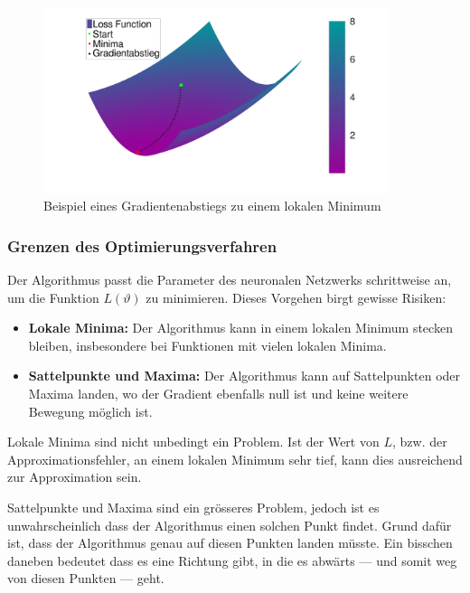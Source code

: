 \begin{figure}
    \centering
    \hspace*{-0.1\textwidth}
    \includegraphics[width=0.9\textwidth]{papers/neuronal/images/gd_close_to_minima_long_distances_with_line.png}
    \caption{Beispiel eines Gradientenabstiegs zu einem lokalen Minimum}
    \label{fig:gradientenabstieg_beispiel}
\end{figure}


\subsubsection{Grenzen des Optimierungsverfahren}\label{neuronal:subsubsection:optimierungsverfahren_grenzen}

Der Algorithmus passt die Parameter des neuronalen Netzwerks schrittweise an, um die Funktion \( L(\vartheta) \) zu minimieren. 
Dieses Vorgehen birgt gewisse Risiken:
\begin{itemize}
    \item \textbf{Lokale Minima:} Der Algorithmus kann in einem lokalen Minimum stecken bleiben, insbesondere bei Funktionen mit vielen lokalen Minima.
%
    \item \textbf{Sattelpunkte und Maxima:} Der Algorithmus kann auf Sattelpunkten oder Maxima landen, wo der Gradient ebenfalls null ist und keine weitere Bewegung möglich ist.
%
%
\end{itemize}

Lokale Minima sind nicht unbedingt ein Problem. 
Ist der Wert von $L$, bzw. der Approximationsfehler, an einem lokalen Minimum sehr tief, kann dies ausreichend zur Approximation sein.

Sattelpunkte und Maxima sind ein grösseres Problem, jedoch ist es unwahrscheinlich dass der Algorithmus einen solchen Punkt findet.
Grund dafür ist, dass der Algorithmus genau auf diesen Punkten landen müsste.
Ein bisschen daneben bedeutet dass es eine Richtung gibt, in die es abwärts --- und somit weg von diesen Punkten --- geht.


